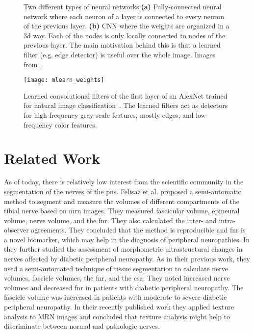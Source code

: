 \begin{figure}[htbp]
	\centering
	\hfill
	\caption[Regular Neural Networks and Convolutional Neural Networks]{Two different types of neural networks:\textbf{(a)} Fully-connected neural network where each neuron of a layer is connected to every neuron of the previous layer. \textbf{(b)} CNN where the weights are organized in a \gls{3d} way. Each of the nodes is only locally connected to nodes of the previous layer. The main motivation behind this is that a learned filter (e.g. edge detector) is useful over the whole image. Images from~\cite{KarpathyStanfordRecognition}.}
	\label{fig:mlearn_nn_cnn}  
\end{figure}


\begin{figure}[htbp]
    \centering
	\texttt{[image: mlearn\_weights]}
    \caption[Learned Weights of a trained AlexNet]{Learned convolutional filters of the first layer of an AlexNet trained for natural image classification~\cite{Krizhevsky2012ImageNetNetworks}. The learned filters act as detectors for high-frequency gray-scale features, mostly edges, and low-frequency color features.}
    \label{fig:mlearn_weights}
\end{figure}

\section{Related Work} %
As of today, there is relatively low interest from the scientific community in the segmentation of the nerves of the \gls{pns}. Felisaz et al.\cite{Felisaz2016NerveMicro-neurography} proposed a semi-automatic method to segment and measure the volumes of different compartments of the tibial nerve based on \gls{mrn} images. They measured fascicular volume, epineural volume, nerve volume, and the \gls{fnr}. They also calculated the inter- and intra-observer agreements. They concluded that the method is reproducible and \gls{fnr} is a novel biomarker, which may help in the diagnosis of peripheral neuropathies.
In \cite{Felisaz2017MRNeuropathy.} they further studied the assessment of morphometric ultrastructural changes in nerves affected by diabetic peripheral neuropathy. As in their previous work, they used a semi-automated technique of tissue segmentation to calculate nerve volumes, fascicle volumes, the \gls{fnr}, and the \gls{csa}. They noted increased nerve volumes and decreased \gls{fnr} in patients with diabetic peripheral neuropathy. The fascicle volume was increased in patients with moderate to severe diabetic peripheral neuropathy.
In their recently published work \cite{FelisazTextureNeuropathy} they applied texture analysis to MRN images and concluded that texture analysis might help to discriminate between normal and pathologic nerves.

